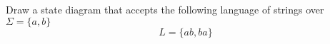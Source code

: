 Draw a state diagram that accepts the following
language of strings over $\Sigma =
\{ a, b \}$ 
\[
L = \{ab, ba\}
\]
